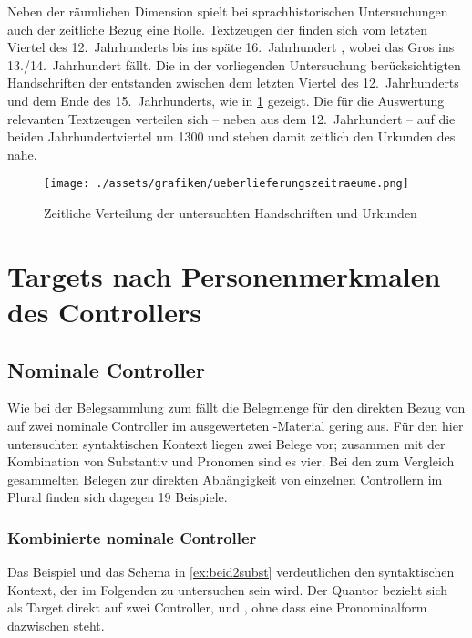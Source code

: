 Neben der räumlichen Dimension spielt bei sprachhistorischen Untersuchungen
auch der zeitliche Bezug eine Rolle. Textzeugen der \citet{kc} finden sich vom
letzten Viertel des 12.~Jahrhunderts \autocites{kc:A1} bis ins späte
16.~Jahrhundert \autocite{kc:T}, wobei das Gros ins 13./14.~Jahrhundert fällt.
Die in der vorliegenden Untersuchung berücksichtigten Handschriften der
\citet{kc} entstanden zwischen dem letzten Viertel des 12.~Jahrhunderts und dem
Ende des 15.~Jahrhunderts, wie in \cref{fig:zeitstrahl} gezeigt. Die für die
Auswertung relevanten Textzeugen verteilen sich -- neben \citet{kc:A1} aus dem
12.~Jahrhundert -- auf die beiden Jahrhundertviertel um 1300 und stehen damit
zeitlich den Urkunden des \CAO{} nahe.

\begin{figure}[p]
\centering
\texttt{[image: ./assets/grafiken/ueberlieferungszeitraeume.png]}
\caption{Zeitliche Verteilung der untersuchten Handschriften und Urkunden}
\label{fig:zeitstrahl}
\end{figure}

\section{Targets nach Personenmerkmalen des Controllers}
\label{sec:kctargpers}

\subsection{Nominale Controller}

Wie bei der Belegsammlung zum \CAO{} fällt die Belegmenge für den
direkten Bezug von  auf zwei nominale Controller im ausgewerteten
\citet{kc}-Material gering aus. Für den hier untersuchten syntaktischen Kontext
liegen zwei Belege vor; zusammen mit der Kombination von Substantiv und
Pronomen sind es vier. Bei den zum Vergleich gesammelten Belegen zur direkten
Abhängigkeit von einzelnen Controllern im Plural finden sich dagegen 19
Beispiele.

\subsubsection{Kombinierte nominale Controller}
\label{subsubsec:conomctrlpers}

Das Beispiel und das Schema in \cref{ex:beid2subst} verdeutlichen den
syntaktischen Kontext, der im Folgenden zu untersuchen sein wird. Der Quantor
 bezieht sich als Target direkt auf zwei Controller,
 und , ohne dass eine Pronominalform dazwischen
steht.

